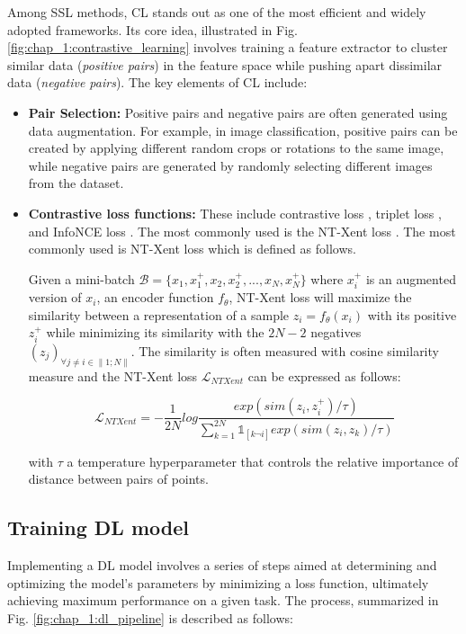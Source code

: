 Among SSL methods, \ac{CL} stands out as one of the most efficient and widely adopted frameworks. Its core idea, illustrated in Fig. \ref{fig:chap_1:contrastive_learning} involves training a feature extractor to cluster similar data (\textit{positive pairs}) in the feature space while pushing apart dissimilar data (\textit{negative pairs}). The key elements of CL include:
\begin{itemize}
    \item \textbf{Pair Selection:} Positive pairs and negative pairs are often generated using data augmentation. For example, in image classification, positive pairs can be created by applying different random crops or rotations to the same image, while negative pairs are generated by randomly selecting different images from the dataset.
    \item \textbf{Contrastive loss functions:} These include contrastive loss \cite{chopra2005learning}, triplet loss \cite{schroff2015facenet}, and InfoNCE loss \cite{oord2018representation}. The most commonly used is the \ac{NT-Xent} loss \cite{chen2020simple}. The most commonly used is \ac{NT-Xent} loss \cite{chen2020simple} which is defined as follows. 
    
    Given a mini-batch $\mathcal{B} = \{x_1, x_1^+, x_2, x_2^+, ..., x_N, x_N^+\}$ where $x_i^+$ is an augmented version of $x_i$, an encoder function $f_{\theta}$, NT-Xent loss will maximize the similarity between a representation of a sample $z_i = f_{\theta}(x_i)$ with its positive $z_i^+$ while minimizing its similarity with the $2N -2$ negatives $(z_j)_{\forall j \neq i \in \|1; N\|}$. The similarity is often measured with cosine similarity measure and the NT-Xent loss $\mathcal{L}_{NTXent}$ can be expressed as follows:

    \begin{equation}\label{eq:ntxent}
        \mathcal{L}_{NTXent} = - \frac{1}{2N} log \frac{exp(sim(z_i, z_i^+)/\tau)}{\sum_{k=1}^{2N} \mathbb{1}_{[k \neg i]} exp(sim(z_i, z_k)/\tau)}
    \end{equation}

    with $\tau$ a temperature hyperparameter that controls the relative importance of distance between pairs of points.
\end{itemize}



\subsection{Training DL model}
Implementing a DL model involves a series of steps aimed at determining and optimizing the model's parameters by minimizing a loss function, ultimately achieving maximum performance on a given task. The process, summarized in Fig. \ref{fig:chap_1:dl_pipeline} is described as follows:


